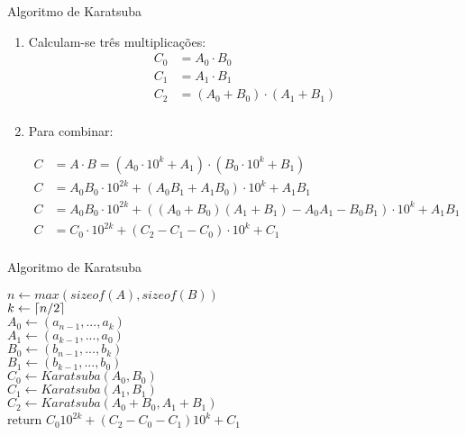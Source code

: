 \documentclass{beamer}
\DeclarePairedDelimiter{\ceil}{\lceil}{\rceil}%
\newcounter{saveenumi}
\newcommand{\conti}{\setcounter{enumi}{\value{saveenumi}}}
\begin{document}
\begin{frame}{Algoritmo de Karatsuba}
	\begin{enumerate}
		\conti
		\item Calculam-se três multiplicações: 
		\begin{equation}
			\begin{split}
		    	C_0 &= A_0 \cdot B_0 \\
		    	C_1 &= A_1 \cdot B_1 \\
		    	C_2 &= (A_0+B_0)\cdot (A_1+B_1) \\
	    	\end{split}
		\end{equation}

		\item Para combinar:

		\begin{equation}\label{eq:karatsuba3}
			\begin{split}
		    	C &= A\cdot B = (A_0\cdot 10^k+A_1) \cdot(B_0\cdot 10^k+B_1)\\
		    	C &= A_0B_0\cdot10^{2k}+(A_0B_1+A_1B_0)\cdot10^k + A_1B_1\\
		    	C &= A_0B_0\cdot10^{2k}+( (A_0+B_0)(A_1+B_1)-A_0A_1-B_0B_1 )\cdot10^k + A_1B_1\\
		    	C &= C_0\cdot10^{2k}+(C_2-C_1-C_0)\cdot10^k+C_1\\
			\end{split}
		\end{equation}
	\end{enumerate}
\end{frame}

\begin{frame}{Algoritmo de Karatsuba}
	\SetAlFnt{\small}
	\begin{algorithm}[H]

	    \BlankLine

	    {
	    	$n \leftarrow max(sizeof(A), sizeof(B))$\\
	    	$k \leftarrow \ceil{n/2}$\\
	    	$A_0 \leftarrow (a_{n-1}, ..., a_{k})$\\
	    	$A_1 \leftarrow (a_{k-1}, ..., a_{0})$\\
	    	$B_0 \leftarrow (b_{n-1}, ..., b_{k})$\\
	    	$B_1 \leftarrow (b_{k-1}, ..., b_{0})$\\
	    	$C_0\leftarrow Karatsuba(A_0, B_0)$\\
	    	$C_1\leftarrow Karatsuba(A_1, B_1)$\\  
	    	$C_2\leftarrow Karatsuba(A_0+B_0, A_1+B_1)$\\
		    return $C_0 10^{2k}+(C_2-C_0-C_1)10^k+C_1$
		}
	    \caption{Algoritmo de Karatsuba em base 10}
	    \label{alg:karatsuba}
	\end{algorithm}
\end{frame}
\end{document}
